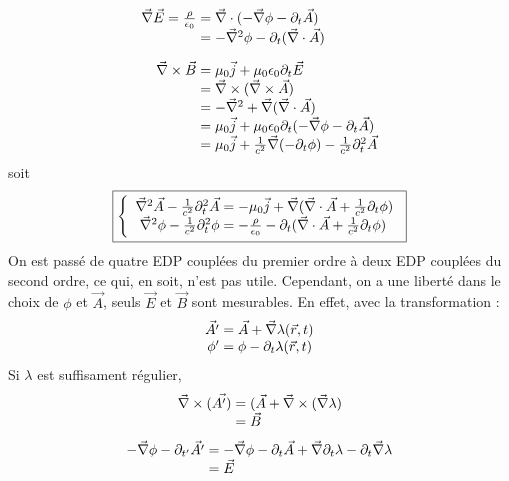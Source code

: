 $$
	\begin{array}{r@{\;}l}
		\nab\vec{E}=\frac{\rho}{\epsilon_0}&=\nab\cdot(-\nab\phi-\partial_t\vec{A})\\
		&=-\nab^2\phi-\partial_t(\nab\cdot\vec{A})\\[10pt]
		\nab\times\vec{B}&=\mu_0\vec{j}+\mu_0\epsilon_0\partial_t\vec{E}\\
		&=\nab\times(\nab\times\vec{A})\\
		&=-\nab^2+\nab(\nab\cdot\vec{A})\\
		&=\mu_0\vec{j}+\mu_0\epsilon_0\partial_t(-\nab\phi-\partial_t\vec{A})\\
		&=\mu_0\vec{j}+\frac{1}{c^2}\nab(-\partial_t\phi)-\frac{1}{c^2}\partial_t^2\vec{A}
	\end{array}
$$
	soit 
$$
	\boxed{\left\{ \begin{array}{{r@{\;}l}}
		\nab^2\vec{A}-\frac{1}{c^2}\partial_t^2\vec{A}&=-\mu_0\vec{j}+\nab(\nab\cdot\vec{A}+\frac{1}{c^2}\partial_t\phi)\\
		\nab^2\phi-\frac{1}{c^2}\partial_t^2\phi&=-\frac{\rho}{\epsilon_0}-\partial_t(\nab\cdot\vec{A}+\frac{1}{c^2}\partial_t\phi) 
	\end{array}\right.}
$$	
	On est passé de quatre EDP couplées du premier ordre à deux EDP couplées du second ordre, ce qui, en soit, n'est pas utile. Cependant, on a une liberté dans le choix de $\phi$ et $\vec{A}$, seuls $\vec{E}$ et $\vec{B}$ sont mesurables. En effet, avec la transformation :\\
$$
		\begin{array}{r@{\;}l}
				\vec{A'} &=\vec{A}+\nab\lambda(\vec{r},t)\\
			\phi'&=\phi-\partial_t\lambda(\vec{r},t)
		\end{array}\\
$$	
	Si $\lambda$ est suffisament régulier,\\
$$
		\begin{array}{r@{\;}l}
			\nab\times(\vec{A')}&=(\vec{A}+\nab\times(\nab\lambda)\\ 
			&=\vec{B}
		\end{array}
$$
$$
		\begin{array}{r@{\;}l}
			-\nab\phi-\partial_{t'}\vec{A'}&=-\nab\phi-\partial_t\vec{A}+\nab\partial_t\lambda-\partial_t\nab\lambda\\
			&=\vec{E}
		\end{array}
$$
	

